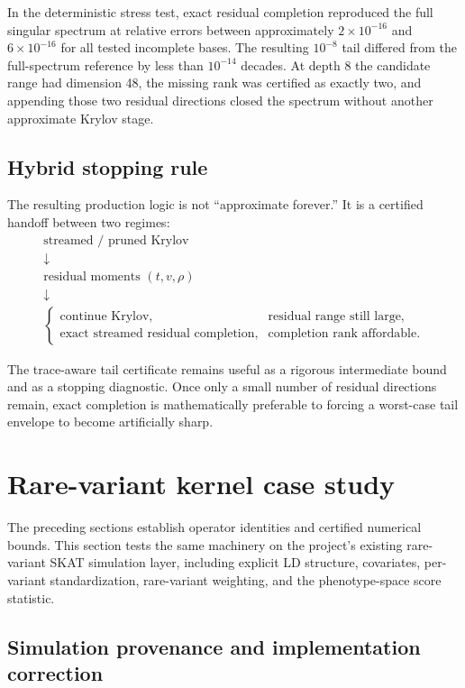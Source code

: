 \documentclass[11pt]{article}
\theoremstyle{definition}
\theoremstyle{remark}
\begin{document}
In the deterministic stress test, exact residual completion reproduced the
full singular spectrum at relative errors between approximately
\(2\times10^{-16}\) and \(6\times10^{-16}\) for all tested incomplete bases.
The resulting \(10^{-8}\) tail differed from the full-spectrum reference by
less than \(10^{-14}\) decades.  At depth 8 the candidate range had dimension
48, the missing rank was certified as exactly two, and appending those two
residual directions closed the spectrum without another approximate Krylov
stage.

\subsection{Hybrid stopping rule}

The resulting production logic is not ``approximate forever.''  It is a
certified handoff between two regimes:
\[
\boxed{
\begin{array}{c}
\text{streamed / pruned Krylov}\\[2mm]
\downarrow\\[-1mm]
\text{residual moments }(t,v,\rho)\\[2mm]
\downarrow\\[-1mm]
\begin{cases}
\text{continue Krylov}, & \text{residual range still large},\\
\text{exact streamed residual completion}, & \text{completion rank affordable}.
\end{cases}
\end{array}
}
\]

The trace-aware tail certificate remains useful as a rigorous intermediate
bound and as a stopping diagnostic.  Once only a small number of residual
directions remain, exact completion is mathematically preferable to forcing a
worst-case tail envelope to become artificially sharp.

\section{Rare-variant kernel case study}\label{sec:final-24}

The preceding sections establish operator identities and certified numerical
bounds.  This section tests the same machinery on the project's existing
rare-variant SKAT simulation layer, including explicit LD structure,
covariates, per-variant standardization, rare-variant weighting, and the
phenotype-space score statistic.

\subsection{Simulation provenance and implementation correction}
\end{document}
